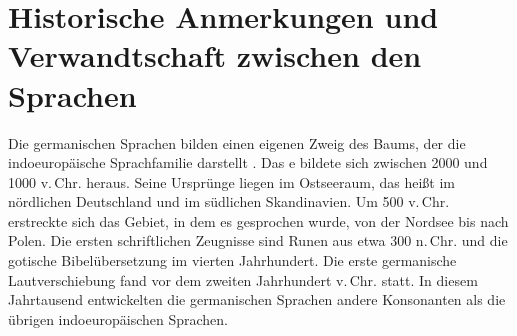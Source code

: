 \section{Historische Anmerkungen und Verwandtschaft zwischen den Sprachen}


Die germanischen Sprachen bilden einen eigenen Zweig des Baums, der die indoeuropäische
Sprachfamilie darstellt \citep[]{Fitch2007a-u}.
Das e bildete sich zwischen 2000 und
1000 v.\,Chr. heraus. Seine Ursprünge liegen im Ostseeraum, das heißt im nördlichen Deutschland und im südlichen
Skandinavien. Um 500 v.\,Chr. erstreckte sich das Gebiet, in dem es gesprochen wurde, von der Nordsee bis nach Polen.
Die ersten schriftlichen Zeugnisse sind Runen aus etwa 300 n.\,Chr. und die gotische Bibelübersetzung im vierten Jahrhundert.
Die erste germanische Lautverschiebung fand vor dem zweiten Jahrhundert v.\,Chr. statt. In diesem Jahrtausend entwickelten die
germanischen Sprachen andere Konsonanten als die übrigen indoeuropäischen Sprachen.

